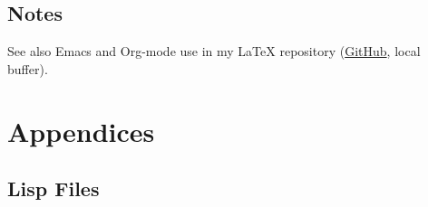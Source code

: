 \documentclass{article}
\begin{document}
\subsection{Notes}
\label{sec:org961feca}
See also Emacs and Org-mode use in my \LaTeX{} repository (\href{https://github.com/jeszyman/latex}{GitHub}, local buffer).\\[0pt]
\section{Appendices}
\label{sec:org32317bf}
\subsection{Lisp Files}
\label{sec:org7c6821c}
\inputminted{emacs-lisp}{../emacs/init.el}

\inputminted{emacs-lisp}{../emacs/load-first.el}

\inputminted{emacs-lisp}{../emacs/load-last.el}
\end{document}
